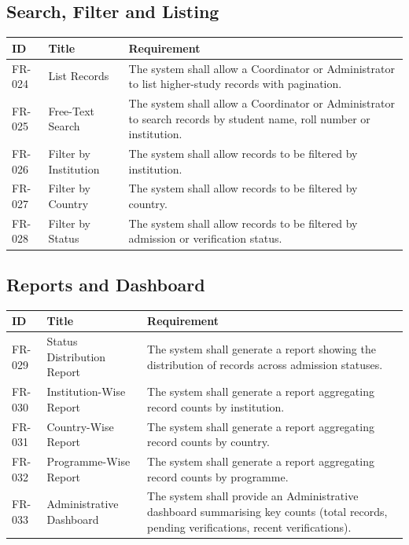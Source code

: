 \documentclass[11pt,a4paper]{article}
\begin{document}
\subsection{Search, Filter and Listing}
\begin{tabularx}{\textwidth}{@{}p{1.6cm} p{4.0cm} Y@{}}
\caption{Functional requirements -- Search, Filter and Listing.}
\label{tab:fr-search}
\toprule
\textbf{ID} & \textbf{Title} & \textbf{Requirement} \\
\midrule
FR-024 & List Records &
  The system shall allow a Coordinator or Administrator to list higher-study records with pagination. \\
FR-025 & Free-Text Search &
  The system shall allow a Coordinator or Administrator to search records by student name, roll number or institution. \\
FR-026 & Filter by Institution &
  The system shall allow records to be filtered by institution. \\
FR-027 & Filter by Country &
  The system shall allow records to be filtered by country. \\
FR-028 & Filter by Status &
  The system shall allow records to be filtered by admission or verification status. \\
\bottomrule
\end{tabularx}

\subsection{Reports and Dashboard}
\begin{tabularx}{\textwidth}{@{}p{1.6cm} p{4.0cm} Y@{}}
\caption{Functional requirements -- Reports and Dashboard.}
\label{tab:fr-reports}
\toprule
\textbf{ID} & \textbf{Title} & \textbf{Requirement} \\
\midrule
FR-029 & Status Distribution Report &
  The system shall generate a report showing the distribution of records across admission statuses. \\
FR-030 & Institution-Wise Report &
  The system shall generate a report aggregating record counts by institution. \\
FR-031 & Country-Wise Report &
  The system shall generate a report aggregating record counts by country. \\
FR-032 & Programme-Wise Report &
  The system shall generate a report aggregating record counts by programme. \\
FR-033 & Administrative Dashboard &
  The system shall provide an Administrative dashboard summarising key counts (total records, pending verifications, recent verifications). \\
\bottomrule
\end{tabularx}
\end{document}
